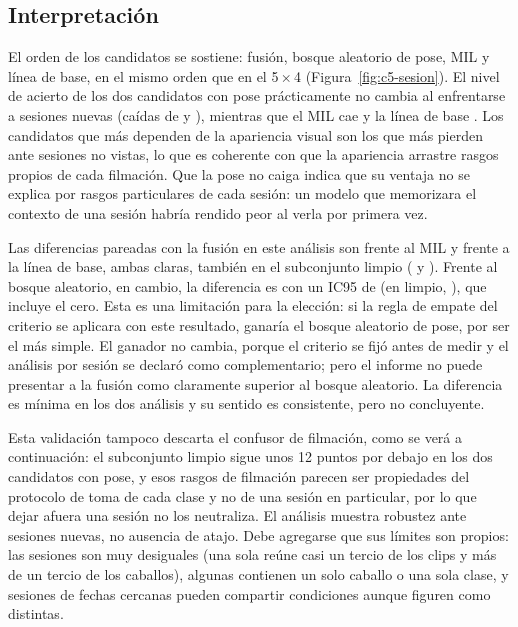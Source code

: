 \subsection{Interpretación}
El orden de los candidatos se sostiene: fusión, bosque aleatorio de pose, MIL y línea de base, en el mismo orden que en el 5\,$\times$\,4 (Figura~\ref{fig:c5-sesion}). El nivel de acierto de los dos candidatos con pose prácticamente no cambia al enfrentarse a sesiones nuevas (caídas de \FusionSesionCaida{} y \RFPoseSesionCaida{}), mientras que el MIL cae \MILSesionCaida{} y la línea de base \BaseSesionCaida{}. Los candidatos que más dependen de la apariencia visual son los que más pierden ante sesiones no vistas, lo que es coherente con que la apariencia arrastre rasgos propios de cada filmación. Que la pose no caiga indica que su ventaja no se explica por rasgos particulares de cada sesión: un modelo que memorizara el contexto de una sesión habría rendido peor al verla por primera vez.

Las diferencias pareadas con la fusión en este análisis son \DifFusionMILSesion{} \DifFusionMILSesionIC{} frente al MIL y \DifFusionBaseSesion{} \DifFusionBaseSesionIC{} frente a la línea de base, ambas claras, también en el subconjunto limpio (\DifFusionMILSesionLimpio{} \DifFusionMILSesionLimpioIC{} y \DifFusionBaseSesionLimpio{} \DifFusionBaseSesionLimpioIC{}). Frente al bosque aleatorio, en cambio, la diferencia es \DifFusionRFSesion{} con un IC95 de {\DifFusionRFSesionIC{}} (en limpio, \DifFusionRFSesionLimpio{} \DifFusionRFSesionLimpioIC{}), que incluye el cero. Esta es una limitación para la elección: si la regla de empate del criterio se aplicara con este resultado, ganaría el bosque aleatorio de pose, por ser el más simple. El ganador no cambia, porque el criterio se fijó antes de medir y el análisis por sesión se declaró como complementario; pero el informe no puede presentar a la fusión como claramente superior al bosque aleatorio. La diferencia es mínima en los dos análisis y su sentido es consistente, pero no concluyente.

Esta validación tampoco descarta el confusor de filmación, como se verá a continuación: el subconjunto limpio sigue unos 12 puntos por debajo en los dos candidatos con pose, y esos rasgos de filmación parecen ser propiedades del protocolo de toma de cada clase y no de una sesión en particular, por lo que dejar afuera una sesión no los neutraliza. El análisis muestra robustez ante sesiones nuevas, no ausencia de atajo. Debe agregarse que sus límites son propios: las sesiones son muy desiguales (una sola reúne casi un tercio de los clips y más de un tercio de los caballos), algunas contienen un solo caballo o una sola clase, y sesiones de fechas cercanas pueden compartir condiciones aunque figuren como distintas.


